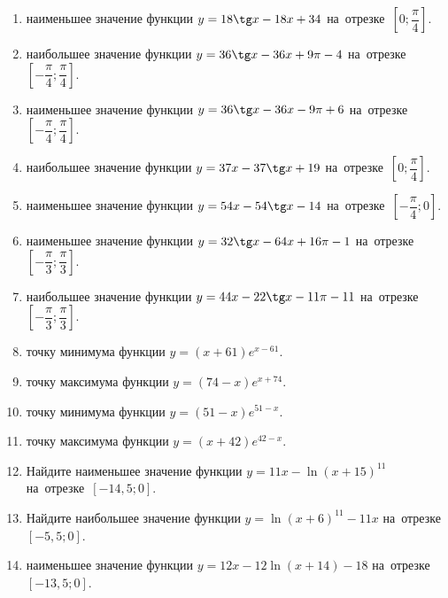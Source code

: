 \documentclass[a4paper,10pt]{article}
\begin{document}
\begin{enumerate}
\item {} наименьшее значение функции $y = 18\tg x-18x+34$ на~отрезке~$\left[0;\dfrac{\pi }{4}\right]$.

\item {} наибольшее значение функции $y=36\tg x-36x+9\pi -4$ на~отрезке~$\left[-\dfrac{\pi }{4};\dfrac{\pi }{4}\right]$.

\item {} наименьшее значение функции $y=36\tg x-36x-9\pi +6$ на~отрезке~$\left[-\dfrac{\pi }{4};\dfrac{\pi }{4}\right]$.

\item {} наибольшее значение функции $y = 37x-37\tg x +19$ на~отрезке~$\left[0;\dfrac{\pi }{4}\right]$.

\item {} наименьшее значение функции $y = 54x-54\tg x -14$ на~отрезке~$\left[-\dfrac{\pi }{4};0\right]$.

\item {} наименьшее значение функции $y = 32\tg x-64x+16 \pi -1$ на~отрезке~$\left[-\dfrac{\pi }{3};\dfrac{\pi }{3}\right]$.

\item {} наибольшее значение функции $y = 44x-22\tg x-11\pi -11$ на~отрезке~$\left[-\dfrac{\pi }{3};\dfrac{\pi }{3}\right]$.

\item {} точку минимума функции $y = \left(x+61\right)e^{x-61}$.

\item {} точку максимума функции $y = \left(74-x\right)e^{x+74}$.

\item {} точку минимума функции $y = \left(51-x\right)e^{51-x}$.

\item {} точку максимума функции $y = \left(x+42\right)e^{42-x}$.

\item Найдите наименьшее значение функции $y = 11x-\ln \left(x+15\right)^{11}$ на~отрезке~$\left[-14,5;0\right]$.

\item Найдите наибольшее значение функции $y = \ln \left(x+6\right)^{11}-11x$ на~отрезке~$\left[-5,5;0\right]$.

\item {} наименьшее значение функции $y = 12x-12\ln \left(x+14\right) -18$ на~отрезке~$\left[-13,5;0\right]$.


\end{enumerate}
\end{document}
